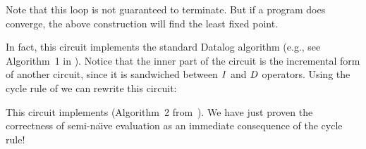 Note that this loop is not guaranteed to terminate.  But if a program
does converge, the above construction will find the least fixed point.

In fact, this circuit implements the standard Datalog
 algorithm (e.g., see Algorithm~1 in
\cite{greco-sldm15}).  Notice that the inner part of the circuit is
the incremental form of another circuit, since it is sandwiched
between $\mathit{I}$ and $\mathit{D}$ operators.  Using the cycle rule of we can
rewrite this circuit:

\begin{center}
\end{center}

This circuit implements 
(Algorithm~2 from~\cite{greco-sldm15}).  We have just proven the
correctness of semi-na\"{\i}ve evaluation as an immediate consequence
of the cycle rule!

